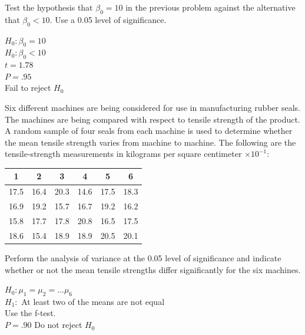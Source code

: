 \documentclass[addpoints,12pt]{exam}
\begin{document}
\begin{questions}
\question 
Test the hypothesis that $\beta_0 = 10$ in the previous problem against the alternative that $\beta_0 < 10$.
Use a 0.05 level of significance.
\begin{solution}

$H_0: \beta_0 = 10$\\
$H_0: \beta_0 < 10$\\
$t = 1.78$\\
$P = .95$\\
Fail to reject $H_0$
\end{solution}

\question Six different machines are being considered for
use in manufacturing rubber seals. The machines are
being compared with respect to tensile strength of the
product. A random sample of four seals from each machine
is used to determine whether the mean tensile
strength varies from machine to machine. The following
are the tensile-strength measurements in kilograms
per square centimeter $\times 10^{-1}$:
\begin{table}[H]
\begin{center}
\begin{tabular}{|c|c|c|c|c|c|}
\hline
1&2&3&4&5&6 \\ \hline
17.5&16.4&20.3&14.6&17.5&18.3 \\
16.9&19.2&15.7&16.7&19.2&16.2 \\
15.8&17.7&17.8&20.8&16.5&17.5 \\
18.6&15.4&18.9&18.9&20.5&20.1 \\ \hline
\end{tabular}
\end{center}
\label{default}
\end{table}%
Perform the analysis of variance at the 0.05 level of significance
and indicate whether or not the mean tensile
strengths differ significantly for the six machines.
\begin{solution}
$H_0: \mu_1 = \mu_2 = \ldots \mu_6$\\
$H_1:$ At least two of the means are not equal\\
Use the f-test.\\
$P = .90$
Do not reject $H_0$\\
\end{solution}



\end{questions}
\end{document}
